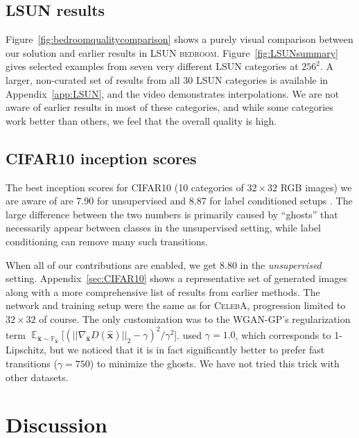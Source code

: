 \documentclass{article}
\begin{document}
\subsection{LSUN results}
\figbedroomqualitycomparison
\figLSUNsummary
Figure~\ref{fig:bedroomqualitycomparison} shows a purely visual comparison between our solution and earlier results in \textsc{LSUN bedroom}. 
Figure~\ref{fig:LSUNsummary} gives selected examples from seven very different \textsc{LSUN} categories at $256^2$. A larger, non-curated set of results from all 30 \textsc{LSUN} categories is available in Appendix~\ref{app:LSUN}, and the video demonstrates interpolations. We are not aware of earlier results in most of these categories, and while some categories work better than others, we feel that the overall quality is high.

\subsection{CIFAR10 inception scores}
\label{sec:cifar10}
The best inception scores for \textsc{CIFAR10} (10 categories of $32\times32$ RGB images) we are aware of are 7.90 for unsupervised and 8.87 for label conditioned setups \citep{Grinblat2017}. The large difference between the two numbers is primarily caused by ``ghosts'' that necessarily appear between classes in the unsupervised setting, while label conditioning can remove many such transitions.

When all of our contributions are enabled, we get $8.80$ in the \emph{unsupervised} setting. Appendix~\ref{sec:CIFAR10} shows a representative set of generated images along with a more comprehensive list of results from earlier methods. The network and training setup were the same as for \textsc{CelebA}, progression limited to $32\times32$ of course. The only customization was to the WGAN-GP's regularization term $\mathop{\mathbb{E}}_{\hat{\mathbf{x}}\sim\mathbb{P}_{\hat{\mathbf{x}}}} [(||\nabla_{\hat{\mathbf{x}}}D(\hat{\mathbf{x}})||_2 - \gamma)^2 / \gamma^2$]. \cite{Gulrajani2017} used $\gamma=1.0$, which corresponds to \mbox{1-Lipschitz}, but we noticed that it is in fact significantly better to prefer fast transitions ($\gamma=750$) to minimize the ghosts. We have not tried this trick with other datasets.

\section{Discussion}
\label{sec:discussion}
\end{document}
